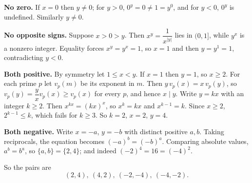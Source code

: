\textbf{No zero.} If $x=0$ then $y\ne0$; for $y>0$, $0^y=0\ne1=y^0$, and for $y<0$, $0^y$ is undefined. Similarly $y\ne0$.

\textbf{No opposite signs.} Suppose $x>0>y$. Then $x^y=\dfrac1{x^{|y|}}$ lies in $(0,1]$, while $y^x$ is a nonzero integer. Equality forces $x^y=y^x=1$, so $x=1$ and then $y=y^1=1$, contradicting $y<0$.

\textbf{Both positive.} By symmetry let $1\le x<y$. If $x=1$ then $y=1$, so $x\ge2$. For each prime $p$ let $v_p(m)$ be its exponent in $m$. Then $y\,v_p(x)=x\,v_p(y)$, so $v_p(y)=\dfrac yx v_p(x)\ge v_p(x)$ for every $p$, and hence $x\mid y$. Write $y=kx$ with an integer $k\ge2$. Then $x^{kx}=(kx)^x$, so $x^k=kx$ and $x^{k-1}=k$. Since $x\ge2$, $2^{k-1}\le k$, which fails for $k\ge3$. So $k=2$, $x=2$, $y=4$.

\textbf{Both negative.} Write $x=-a$, $y=-b$ with distinct positive $a,b$. Taking reciprocals, the equation becomes $(-a)^b=(-b)^a$. Comparing absolute values, $a^b=b^a$, so $\{a,b\}=\{2,4\}$; and indeed $(-2)^4=16=(-4)^2$.

So the pairs are
\[\boxed{(2,4),\ (4,2),\ (-2,-4),\ (-4,-2)}.\]
